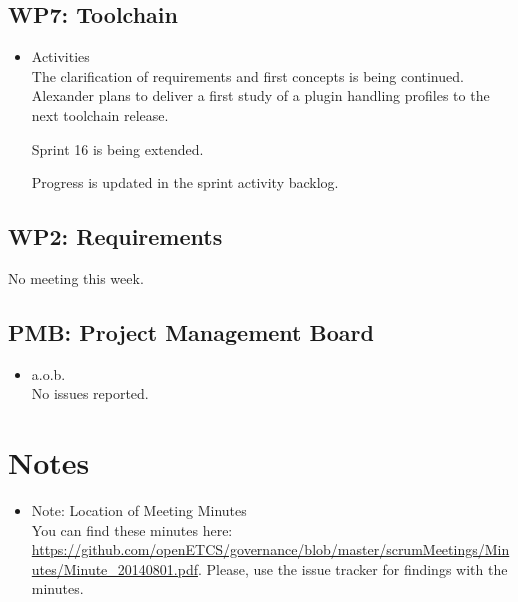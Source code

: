 \documentclass[a4paper, 11pt]{article}
\begin{document}
\subsection{WP7: Toolchain}

\begin{itemize}
\item Activities\\
The clarification of requirements and first concepts is being continued. Alexander plans to deliver a first study of a plugin handling profiles to the next toolchain release.

Sprint 16 is being extended.

Progress is updated in the sprint activity backlog.

\end{itemize}

\subsection{WP2: Requirements}


No meeting this week.


\subsection{PMB: Project Management Board}
\begin{itemize}
\item a.o.b.\\
No issues reported. 

\end{itemize}

\section{Notes}
\begin{itemize}

\item Note: Location of Meeting Minutes\\
You can find these minutes here: \url{https://github.com/openETCS/governance/blob/master/scrumMeetings/Minutes/Minute_20140801.pdf}. Please, use the issue tracker for findings with the minutes.

\end{itemize}
\end{document}
